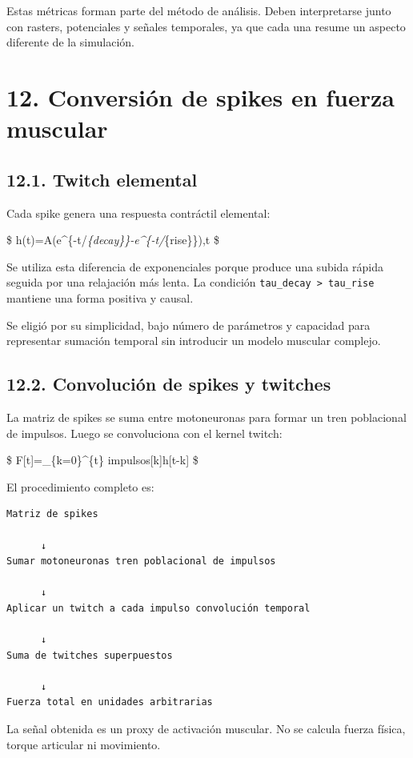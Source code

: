 \documentclass[11pt,a4paper]{article}
\begin{document}
Estas métricas forman parte del método de análisis. Deben interpretarse
junto con rasters, potenciales y señales temporales, ya que cada una
resume un aspecto diferente de la simulación.

\hypertarget{conversiuxf3n-de-spikes-en-fuerza-muscular}{%
\section{12. Conversión de spikes en fuerza
muscular}\label{conversiuxf3n-de-spikes-en-fuerza-muscular}}

\hypertarget{twitch-elemental}{%
\subsection{12.1. Twitch elemental}\label{twitch-elemental}}

Cada spike genera una respuesta contráctil elemental:

\$
h(t)=A\left(e\^{}\{-t/\tau\emph{\{decay\}\}-e\^{}\{-t/\tau}\{rise\}\}\right),\qquad t
\$

Se utiliza esta diferencia de exponenciales porque produce una subida
rápida seguida por una relajación más lenta. La condición
\texttt{tau\_decay\ \textgreater{}\ tau\_rise} mantiene una forma
positiva y causal.

Se eligió por su simplicidad, bajo número de parámetros y capacidad para
representar sumación temporal sin introducir un modelo muscular
complejo.

\hypertarget{convoluciuxf3n-de-spikes-y-twitches}{%
\subsection{12.2. Convolución de spikes y
twitches}\label{convoluciuxf3n-de-spikes-y-twitches}}

La matriz de spikes se suma entre motoneuronas para formar un tren
poblacional de impulsos. Luego se convoluciona con el kernel twitch:

\$ F{[}t{]}=\sum\_\{k=0\}\^{}\{t\} impulsos{[}k{]}h{[}t-k{]} \$

El procedimiento completo es:

\begin{lstlisting}
Matriz de spikes

      ↓ 
Sumar motoneuronas tren poblacional de impulsos

      ↓ 
Aplicar un twitch a cada impulso convolución temporal

      ↓
Suma de twitches superpuestos

      ↓
Fuerza total en unidades arbitrarias
\end{lstlisting}

La señal obtenida es un proxy de activación muscular. No se calcula
fuerza física, torque articular ni movimiento.
\end{document}
